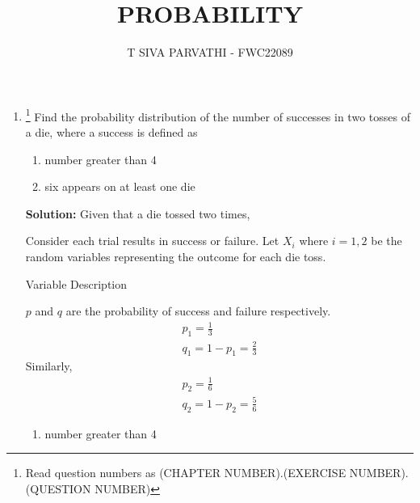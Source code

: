 \documentclass{article}
\newcommand{\solution}{\noindent \textbf{Solution: }}
\begin{document}
\title{PROBABILITY}
\author{\Large T SIVA PARVATHI - FWC22089}
\date{}

\maketitle
\begin{enumerate}[label=13.\arabic{enumi}.\arabic{enumii}]%
\setcounter{enumi}{3}
\setcounter{enumii}{5}

\item \footnote{Read question numbers as (CHAPTER NUMBER).(EXERCISE NUMBER).(QUESTION NUMBER)}
Find the probability distribution of the number of successes in two tosses of a die, where a success is defined as
\begin{enumerate}
\item number greater than 4
\item six appears on at least one die
\end{enumerate}

\solution
Given that a die tossed two times,

Consider each trial results in success or failure. Let $X_i$ where $i = 1,2$ be the random variables representing the outcome for each die toss. 
\begin{table}[h]\centering
	
	 \caption{Variable Description}\label{tab:}
\end{table}

$p$ and $q$ are the probability of success and failure respectively.
\begin{align}
p_1 = \frac{1}{3}\\                         
q_1 = 1 - p_1 = \frac{2}{3}      
\end{align}
Similarly,
\begin{align}
p_2 = \frac{1}{6}\\
q_2 = 1 - p_2 = \frac{5}{6}      
\end{align}
\begin{enumerate}
\item number greater than 4


\end{enumerate}
\end{enumerate}
\end{document}
